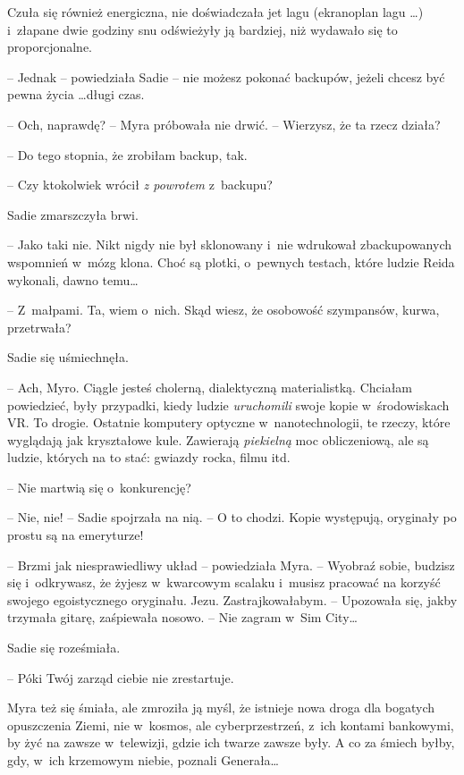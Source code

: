 \documentclass[oneside,polish,11pt,sfheadings]{mwbk}
\begin{document}
Czuła się również energiczna, nie doświadczała jet \dywiz lagu
(ekranoplan \dywiz lagu \ldots) i~złapane dwie godziny snu odświeżyły ją bardziej,
niż wydawało się to proporcjonalne.

-- Jednak -- powiedziała Sadie -- nie możesz pokonać backupów, jeżeli
chcesz być pewna życia \ldots długi czas.

-- Och, naprawdę? -- Myra próbowała nie drwić. -- Wierzysz, że ta rzecz
działa?

-- Do tego stopnia, że zrobiłam backup, tak.

-- Czy ktokolwiek wrócił \textit{z powrotem} z~backupu?

Sadie zmarszczyła brwi. 

-- Jako taki nie. Nikt nigdy nie był sklonowany i~nie wdrukował zbackupowanych wspomnień w~mózg klona. Choć są plotki, o~pewnych testach, które ludzie Reida wykonali, dawno temu\ldots

-- Z~małpami. Ta, wiem o~nich. Skąd wiesz, że osobowość szympansów,
kurwa, przetrwała?

Sadie się uśmiechnęła. 

-- Ach, Myro. Ciągle jesteś cholerną, dialektyczną
materialistką. Chciałam powiedzieć, były przypadki, kiedy ludzie
\textit{uruchomili }swoje kopie w~środowiskach VR. To drogie. Ostatnie
komputery optyczne w~nanotechnologii, te rzeczy, które wyglądają jak
kryształowe kule. Zawierają \textit{piekielną} moc obliczeniową, ale są
ludzie, których na to stać: gwiazdy rocka, filmu itd.

-- Nie martwią się o~konkurencję?

-- Nie, nie! -- Sadie spojrzała na nią. -- O to chodzi. Kopie występują,
oryginały po prostu są na emeryturze!

-- Brzmi jak niesprawiedliwy układ -- powiedziała Myra. -- Wyobraź sobie,
budzisz się i~odkrywasz, że żyjesz w~kwarcowym scalaku i~musisz pracować
na korzyść swojego egoistycznego oryginału. Jezu. Zastrajkowałabym. -- Upozowała się, jakby trzymała gitarę, zaśpiewała nosowo. -- Nie zagram w~Sim City\ldots

Sadie się roześmiała. 

-- Póki Twój zarząd ciebie nie zrestartuje.

Myra też się śmiała, ale zmroziła ją myśl, że istnieje nowa droga dla
bogatych opuszczenia Ziemi, nie w~kosmos, ale cyberprzestrzeń, z~ich
kontami bankowymi, by żyć na zawsze w~telewizji, gdzie ich twarze zawsze
były. A co za śmiech byłby, gdy, w~ich krzemowym niebie, poznali
Generała\ldots
\end{document}
